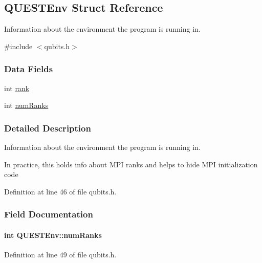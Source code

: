 \hypertarget{structQUESTEnv}{}\subsection{Q\+U\+E\+S\+T\+Env Struct Reference}
\label{structQUESTEnv}


Information about the environment the program is running in.  




{\ttfamily \#include $<$qubits.\+h$>$}

\subsubsection*{Data Fields}
\begin{DoxyCompactItemize}
\item 
int \hyperlink{structQUESTEnv_a1bdb6d425a2ce6a468f93929c0b26d73}{rank}
\item 
int \hyperlink{structQUESTEnv_ab9d9ce82e2d5f1b39aa9efc3accb3742}{num\+Ranks}
\end{DoxyCompactItemize}


\subsubsection{Detailed Description}
Information about the environment the program is running in. 

In practice, this holds info about M\+PI ranks and helps to hide M\+PI initialization code 

Definition at line 46 of file qubits.\+h.



\subsubsection{Field Documentation}
\paragraph[{\texorpdfstring{num\+Ranks}{numRanks}}]{\setlength{\rightskip}{0pt plus 5cm}int Q\+U\+E\+S\+T\+Env\+::num\+Ranks}\hypertarget{structQUESTEnv_ab9d9ce82e2d5f1b39aa9efc3accb3742}{}\label{structQUESTEnv_ab9d9ce82e2d5f1b39aa9efc3accb3742}


Definition at line 49 of file qubits.\+h.



